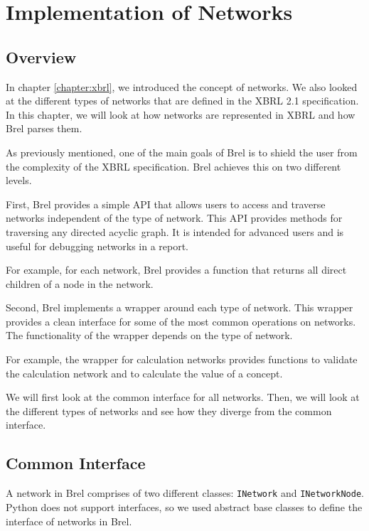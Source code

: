 \section{Implementation of Networks}
\label{sec:implementation_networks}

\subsection{Overview}

In chapter \ref{chapter:xbrl}, we introduced the concept of networks.
We also looked at the different types of networks that are defined in the XBRL 2.1 specification.
In this chapter, we will look at how networks are represented in XBRL and how Brel parses them.

As previously mentioned, one of the main goals of Brel is to shield the user from the complexity of the XBRL specification.
Brel achieves this on two different levels.

First, Brel provides a simple API that allows users to access and traverse networks independent of the type of network.
This API provides methods for traversing any directed acyclic graph.
It is intended for advanced users and is useful for debugging networks in a report.

For example, for each network, Brel provides a function that returns all direct children of a node in the network.

Second, Brel implements a wrapper around each type of network.
This wrapper provides a clean interface for some of the most common operations on networks.
The functionality of the wrapper depends on the type of network.

For example, the wrapper for calculation networks provides functions to validate the calculation network and to calculate the value of a concept.

We will first look at the common interface for all networks.
Then, we will look at the different types of networks and see how they diverge from the common interface.

\subsection{Common Interface}

A network in Brel comprises of two different classes: \texttt{INetwork} and \texttt{INetworkNode}.
Python does not support interfaces, so we used abstract base classes to define the interface of networks in Brel.

